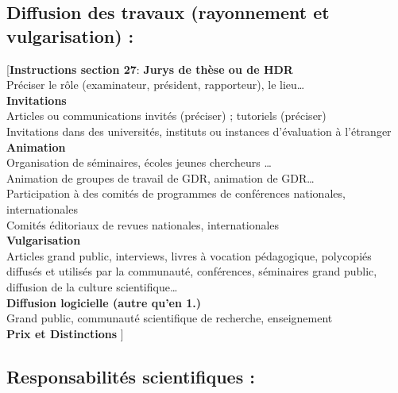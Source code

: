 \documentclass[a4paper,10pt]{article}
\newcommand{\instructionsSection}[1]{{\color{blue}[\textbf{Instructions section 27}: #1]}}
\newcommand{\instructionsSection}[1]{}
\begin{document}
\subsection{Diffusion des travaux (rayonnement et vulgarisation) :}

\instructionsSection{
\textbf{Jurys de thèse ou de HDR}\\
Préciser le rôle (examinateur, président, rapporteur), le lieu…\\
\textbf{Invitations}\\
Articles ou communications invités (préciser) ; tutoriels (préciser)\\
Invitations dans des universités, instituts ou instances d'évaluation à l'étranger\\
\textbf{Animation}\\
Organisation de séminaires, écoles jeunes chercheurs …\\
Animation de groupes de travail de GDR, animation de GDR…\\
Participation à des comités de programmes de conférences nationales, internationales\\
Comités éditoriaux de revues nationales, internationales\\
\textbf{Vulgarisation}\\
Articles grand public, interviews, livres à vocation pédagogique, polycopiés diffusés et utilisés par la communauté, conférences, séminaires grand public, diffusion de la culture scientifique…\\
\textbf{Diffusion logicielle (autre qu'en 1.)}\\
Grand public, communauté scientifique de recherche, enseignement\\
\textbf{Prix et Distinctions}
}

\subsection{Responsabilités scientifiques :}
\end{document}

